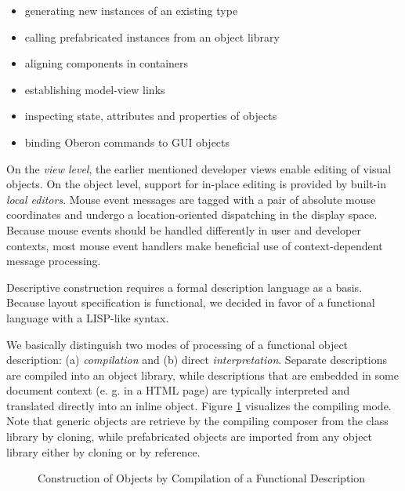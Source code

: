 \begin{itemize}
\item generating new instances of an existing type
\item  calling prefabricated instances from an object library
\item  aligning components in containers
\item  establishing model-view links
\item  inspecting state, attributes and properties of objects
\item  binding Oberon commands to GUI objects
\end{itemize}

On the {\em view level\/}, the earlier mentioned developer views enable
editing of visual objects. On the object level, support for in-place editing
is provided by built-in {\em local editors}. Mouse event messages are tagged
with a pair of absolute mouse coordinates and undergo a location-oriented
dispatching in the display space. Because mouse events should be handled
differently in user and developer contexts, most mouse event handlers make
beneficial use of context-dependent message processing. 


Descriptive construction requires a formal description language as a basis.
Because layout specification is functional, we decided in favor of a
functional
language with a LISP-like syntax.

\ein
We basically distinguish two modes of processing of a functional object
description:
(a) {\em compilation\/} and (b) direct {\em interpretation}.
Separate descriptions are compiled into an object library, while descriptions
that are embedded in some document context (e. g. in a HTML page) are
typically interpreted and translated directly into an inline object.
Figure \ref{fig3} visualizes the compiling mode. Note that generic
objects are retrieve by the compiling composer from the class library
by cloning, while prefabricated objects are imported from any object
library either by cloning or by reference.

\begin{figure}[ht]
\begin{center}
\leavevmode
\epsfysize=6.0cm         %
\caption{Construction of Objects by Compilation of a Functional Description}
\label{fig3}
\end{center}
\end{figure}

